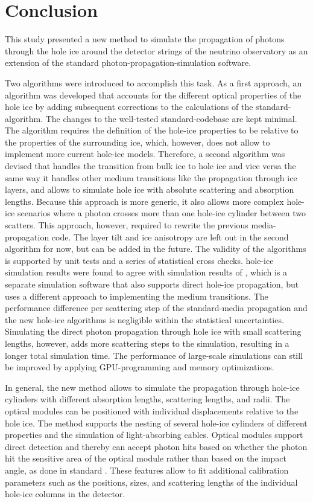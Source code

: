 \section{Conclusion}
\label{sec:conclusion}

This study presented a new method to simulate the propagation of photons
through the hole ice around the detector strings of the
\icecube neutrino observatory as an extension of the standard
\clsim photon-propagation-simulation software.

Two algorithms were introduced to accomplish this task. As a first
approach, an algorithm was developed that accounts for the different
optical properties of the hole ice by adding subsequent corrections to
the calculations of the standard-\clsim algorithm. The changes to the
well-tested standard-\clsim codebase are kept minimal. The algorithm
requires the definition of the hole-ice properties to be relative to the
properties of the surrounding ice, which, however, does not allow to
implement more current hole-ice models. Therefore, a second algorithm
was devised that handles the transition from bulk ice to hole ice and
vice versa the same way it handles other medium transitions like the
propagation through ice layers, and allows to simulate hole ice with
absolute scattering and absorption lengths. Because this approach is
more generic, it also allows more complex hole-ice scenarios where a
photon crosses more than one hole-ice cylinder between two scatters.
This approach, however, required to rewrite the previous
\clsim media-propagation code. The layer tilt and ice anisotropy are
left out in the second algorithm for now, but can be added in the
future. The validity of the algorithms is supported by unit tests and a
series of statistical cross checks. \clsim hole-ice simulation results
were found to agree with simulation results of \ppc, which is a separate
\icecube simulation software that also supports direct hole-ice
propagation, but uses a different approach to implementing the medium
transitions. The performance difference per scattering step of the
standard-\clsim media propagation and the new hole-ice algorithms is
negligible within the statistical uncertainties. Simulating the direct
photon propagation through hole ice with small scattering lengths,
however, adds more scattering steps to the simulation, resulting in a
longer total simulation time. The performance of large-scale simulations
can still be improved by applying GPU-programming and memory
optimizations.

In general, the new method allows to simulate the propagation through
hole-ice cylinders with different absorption lengths, scattering
lengths, and radii. The optical modules can be positioned with
individual displacements relative to the hole ice. The method supports
the nesting of several hole-ice cylinders of different properties and
the simulation of light-absorbing cables. Optical modules support direct
detection and thereby can accept photon hits based on whether the photon
hit the sensitive area of the optical module rather than based on the
impact angle, as done in standard \clsim. These features allow to fit
additional calibration parameters such as the positions, sizes, and
scattering lengths of the individual hole-ice columns in the
\icecube detector.


